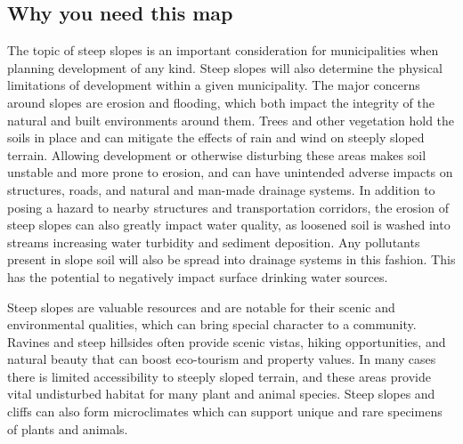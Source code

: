 \subsection*{Why you need this map}
The topic of steep slopes is an important consideration for municipalities when 
planning development of any kind. Steep slopes will also determine the physical 
limitations of development within a given municipality. The major concerns 
around slopes are erosion and flooding, which both impact the integrity of the 
natural and built environments around them. Trees and other vegetation hold the 
soils in place and can mitigate the effects of rain and wind on steeply sloped 
terrain. Allowing development or otherwise disturbing these areas makes soil 
unstable and more prone to erosion, and can have unintended adverse impacts on 
structures, roads, and natural and man-made drainage systems. In addition to 
posing a hazard to nearby structures and transportation corridors, the erosion 
of steep slopes can also greatly impact water quality, as loosened soil is 
washed into streams increasing water turbidity and sediment deposition. Any 
pollutants present in slope soil will also be spread into drainage systems in 
this fashion. This has the potential to negatively impact surface drinking 
water sources.

Steep slopes are valuable resources and are notable for their scenic and 
environmental qualities, which can bring special character to a community. 
Ravines and steep hillsides often provide scenic vistas, hiking opportunities, 
and natural beauty that can boost eco-tourism and property values. In many 
cases there is limited accessibility to steeply sloped terrain, and these areas 
provide vital undisturbed habitat for many plant and animal species. Steep 
slopes and cliffs can also form microclimates which can support unique and rare 
specimens of plants and animals. 

